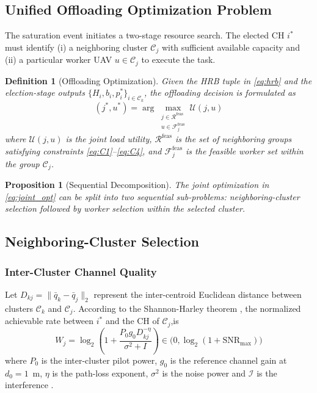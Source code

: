 \documentclass[journal]{IEEEtran}
\newtheorem{definition}{Definition}
\newtheorem{proposition}{Proposition}
\begin{document}
\subsection{Unified Offloading Optimization Problem}

The saturation event initiates a two-stage resource search. The elected CH
$i^{*}$ must identify (i) a neighboring cluster $\mathcal{C}_{j}$ with
sufficient available capacity and (ii) a particular worker UAV
$u\in\mathcal{C}_{j}$ to execute the task.

\begin{definition}[Offloading Optimization]
\label{def:offload_opt}
Given the HRB tuple in \eqref{eq:hrb} and the election-stage outputs
$\{H_{i},b_{i},p_{i}^{*}\}_{i\in\mathcal{C}_{k}}$, the offloading decision is
formulated as
\begin{equation}
  (j^{*},u^{*})=
  \arg\max_{\substack{j\in\mathcal{R}^{\mathrm{feas}}\\
                      u\in\mathcal{F}_{j}^{\mathrm{feas}}}}
  \mathcal{U}(j,u)
  \label{eq:joint_opt}
\end{equation}
where $\mathcal{U}(j,u)$ is the joint load utility,
$\mathcal{R}^{\mathrm{feas}}$ is the set of neighboring groups satisfying
constraints \eqref{eq:C1}--\eqref{eq:C4}, and
$\mathcal{F}_{j}^{\mathrm{feas}}$ is the feasible worker set within
the group $\mathcal{C}_{j}$.
\end{definition}

\begin{proposition}[Sequential Decomposition]
The joint optimization in \eqref{eq:joint_opt} can be split into two
sequential sub-problems: neighboring-cluster selection followed by worker
selection within the selected cluster.
\end{proposition}

\subsection{Neighboring-Cluster Selection}

\subsubsection{Inter-Cluster Channel Quality}

Let $D_{kj}=\|\bar{q}_{k}-\bar{q}_{j}\|_{2}$ represent the inter-centroid
Euclidean distance between clusters $\mathcal{C}_{k}$ and $\mathcal{C}_{j}$.
According to the Shannon-Harley theorem \cite{ref7},
the normalized achievable rate between $i^{*}$ and the CH of
$\mathcal{C}_{j}$,is
\begin{equation}
  W_{j}=\log_{2}\!\left(1+
        \frac{P_{0}g_{0}D_{kj}^{-\eta}}{\sigma^{2}+I}\right)
        \in\bigl(0,\log_{2}(1+\mathrm{SNR}_{\max})\bigr)
  \label{eq:rate}
\end{equation}
where $P_{0}$ is the inter-cluster pilot power, $g_{0}$ is the reference
channel gain at $d_{0}=1$~m, $\eta$ is the path-loss exponent,
$\sigma^{2}$ is the noise power and $\mathcal{I}$ is the interference \cite{ref12,ref13}.
\end{document}
